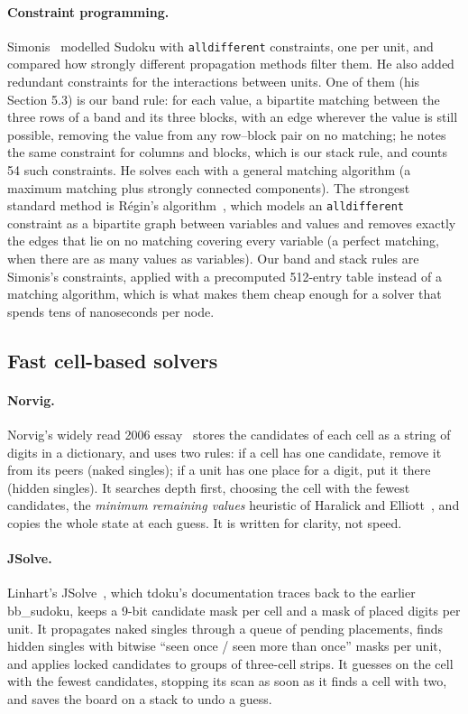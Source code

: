 \documentclass[11pt]{article}
\theoremstyle{definition}
\theoremstyle{plain}
\begin{document}
\paragraph{Constraint programming.} Simonis~\cite{simonis2005sudoku} modelled Sudoku with \texttt{alldifferent}
constraints, one per unit, and compared how strongly different propagation methods filter them. He also added
redundant constraints for the interactions between units. One of them (his Section 5.3) is our band rule: for each
value, a bipartite matching between the three rows of a band and its three blocks, with an edge wherever the value is
still possible, removing the value from any row--block pair on no matching; he notes the same constraint for columns
and blocks, which is our stack rule, and counts 54 such constraints. He solves each with a general matching algorithm
(a maximum matching plus strongly connected components). The strongest
standard method is R\'egin's algorithm~\cite{regin1994filtering}, which models an \texttt{alldifferent} constraint as a
bipartite graph between variables and values and removes exactly the edges that lie on no matching covering every variable (a perfect matching, when there are as many values as variables). Our band and stack rules are Simonis's constraints, applied
with a precomputed 512-entry table instead of a matching algorithm, which is what makes them cheap enough for a
solver that spends tens of nanoseconds per node.

\subsection{Fast cell-based solvers}

\paragraph{Norvig.} Norvig's widely read 2006 essay~\cite{norvig2006sudoku} stores the candidates of each cell as a
string of digits in a dictionary, and uses two rules: if a cell has one candidate, remove it from its peers (naked
singles); if a unit has one place for a digit, put it there (hidden singles). It searches depth first, choosing the
cell with the fewest candidates, the \emph{minimum remaining values} heuristic of Haralick and
Elliott~\cite{haralick1980increasing}, and copies the whole state at each guess. It is written for clarity, not speed.

\paragraph{JSolve.} Linhart's JSolve~\cite{linhart2010jsolve}, which tdoku's documentation traces back to the earlier
bb\_sudoku, keeps a 9-bit candidate mask per cell and a mask of placed digits per unit. It propagates naked singles
through a queue of pending placements, finds hidden singles with bitwise ``seen once / seen more than once'' masks per
unit, and applies locked candidates to groups of three-cell strips. It guesses on the cell with the fewest candidates,
stopping its scan as soon as it finds a cell with two, and saves the board on a stack to undo a guess.
\end{document}

